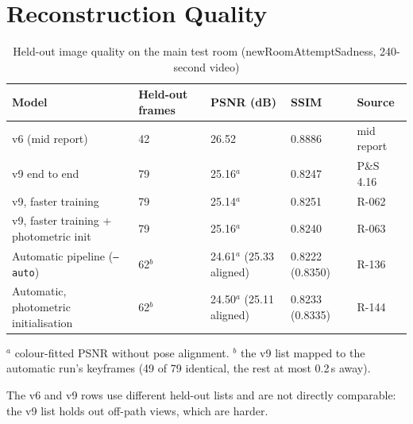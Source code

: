 \section{Reconstruction Quality}
\begin{table}[htbp]
\centering\small
\caption{Held-out image quality on the main test room (newRoomAttemptSadness, 240-second video)}
\label{tab:eval-quality}
\begin{tabular}{p{4.6cm}p{2.2cm}p{1.6cm}p{1.4cm}p{3.2cm}}
\toprule
\textbf{Model} & \textbf{Held-out frames} & \textbf{PSNR (dB)} & \textbf{SSIM} & \textbf{Source} \\
\midrule
v6 (mid report) & 42 & 26.52 & 0.8886 & mid report \\
v9 end to end & 79 & 25.16$^a$ & 0.8247 & P\&S 4.16 \\
v9, faster training & 79 & 25.14$^a$ & 0.8251 & R-062 \\
v9, faster training + photometric init & 79 & 25.16$^a$ & 0.8240 & R-063 \\
Automatic pipeline (\texttt{--auto}) & 62$^b$ & 24.61$^a$ (25.33 aligned) & 0.8222 (0.8350) & R-136 \\
Automatic, photometric initialisation & 62$^b$ & 24.50$^a$ (25.11 aligned) & 0.8233 (0.8335) & R-144 \\
\bottomrule
\end{tabular}

\smallskip
\footnotesize $^a$ colour-fitted PSNR without pose alignment. $^b$ the v9 list mapped to the automatic run's keyframes
(49 of 79 identical, the rest at most 0.2\,s away).
\end{table}
The v6 and v9 rows use different held-out lists and are not directly comparable: the v9 list holds out off-path
views, which are harder.

